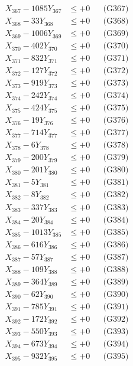 \documentclass[a4paper,10pt]{article}
\begin{document}
{\begin{align}
X_{367} - 1085Y_{367} &\leq +0 && \text{(G367)} \\
X_{368} - 33Y_{368} &\leq +0 && \text{(G368)} \\
X_{369} - 1006Y_{369} &\leq +0 && \text{(G369)} \\
X_{370} - 402Y_{370} &\leq +0 && \text{(G370)} \\
\allowbreak
X_{371} - 832Y_{371} &\leq +0 && \text{(G371)} \\
X_{372} - 127Y_{372} &\leq +0 && \text{(G372)} \\
X_{373} - 919Y_{373} &\leq +0 && \text{(G373)} \\
X_{374} - 242Y_{374} &\leq +0 && \text{(G374)} \\
X_{375} - 424Y_{375} &\leq +0 && \text{(G375)} \\
X_{376} - 19Y_{376} &\leq +0 && \text{(G376)} \\
X_{377} - 714Y_{377} &\leq +0 && \text{(G377)} \\
X_{378} - 6Y_{378} &\leq +0 && \text{(G378)} \\
X_{379} - 200Y_{379} &\leq +0 && \text{(G379)} \\
X_{380} - 201Y_{380} &\leq +0 && \text{(G380)} \\
\allowbreak
X_{381} - 5Y_{381} &\leq +0 && \text{(G381)} \\
X_{382} - 8Y_{382} &\leq +0 && \text{(G382)} \\
X_{383} - 337Y_{383} &\leq +0 && \text{(G383)} \\
X_{384} - 20Y_{384} &\leq +0 && \text{(G384)} \\
X_{385} - 1013Y_{385} &\leq +0 && \text{(G385)} \\
X_{386} - 616Y_{386} &\leq +0 && \text{(G386)} \\
X_{387} - 57Y_{387} &\leq +0 && \text{(G387)} \\
X_{388} - 109Y_{388} &\leq +0 && \text{(G388)} \\
X_{389} - 364Y_{389} &\leq +0 && \text{(G389)} \\
X_{390} - 62Y_{390} &\leq +0 && \text{(G390)} \\
\allowbreak
X_{391} - 785Y_{391} &\leq +0 && \text{(G391)} \\
X_{392} - 172Y_{392} &\leq +0 && \text{(G392)} \\
X_{393} - 550Y_{393} &\leq +0 && \text{(G393)} \\
X_{394} - 673Y_{394} &\leq +0 && \text{(G394)} \\
X_{395} - 932Y_{395} &\leq +0 && \text{(G395)} \\

\end{align}}
\end{document}
